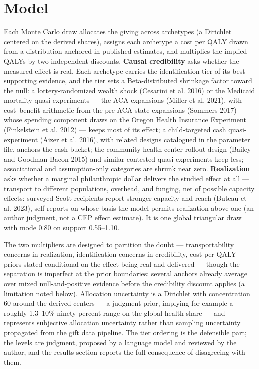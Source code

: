\documentclass[
  11pt,
  letterpaper,
  DIV=11,
  numbers=noendperiod]{scrartcl}
\begin{document}
\section{Model}\label{model}

Each Monte Carlo draw allocates the giving across archetypes (a
Dirichlet centered on the derived shares), assigns each archetype a cost
per QALY drawn from a distribution anchored in published estimates, and
multiplies the implied QALYs by two independent discounts.
\textbf{Causal credibility} asks whether the measured effect is real.
Each archetype carries the identification tier of its best supporting
evidence, and the tier sets a Beta-distributed shrinkage factor toward
the null: a lottery-randomized wealth shock (Cesarini et al. 2016) or
the Medicaid mortality quasi-experiments --- the ACA expansions (Miller
et al. 2021), with cost--benefit arithmetic from the pre-ACA state
expansions (Sommers 2017) whose spending component draws on the Oregon
Health Insurance Experiment (Finkelstein et al. 2012) --- keeps most of
its effect; a child-targeted cash quasi-experiment (Aizer et al. 2016),
with related designs catalogued in the parameter file, anchors the cash
bucket; the community-health-center rollout design (Bailey and
Goodman-Bacon 2015) and similar contested quasi-experiments keep less;
associational and assumption-only categories are shrunk near zero.
\textbf{Realization} asks whether a marginal philanthropic dollar
delivers the studied effect at all --- transport to different
populations, overhead, and funging, net of possible capacity effects:
surveyed Scott recipients report stronger capacity and reach (Buteau et
al. 2023), self-reports on whose basis the model permits realization
above one (an author judgment, not a CEP effect estimate). It is one
global triangular draw with mode 0.80 on support 0.55--1.10.

The two multipliers are designed to partition the doubt ---
transportability concerns in realization, identification concerns in
credibility, cost-per-QALY priors stated conditional on the effect being
real and delivered --- though the separation is imperfect at the prior
boundaries: several anchors already average over mixed null-and-positive
evidence before the credibility discount applies (a limitation noted
below). Allocation uncertainty is a Dirichlet with concentration 60
around the derived centers --- a judgment prior, implying for example a
roughly 1.3--10\% ninety-percent range on the global-health share ---
and represents subjective allocation uncertainty rather than sampling
uncertainty propagated from the gift data pipeline. The tier ordering is
the defensible part; the levels are judgment, proposed by a language
model and reviewed by the author, and the results section reports the
full consequence of disagreeing with them.
\end{document}
